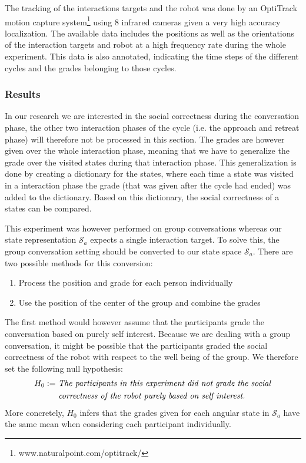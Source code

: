 \documentclass[a4paper,11pt]{report}
\begin{document}
The tracking of the interactions targets and the robot was done by an OptiTrack motion capture system\footnote{www.naturalpoint.com/optitrack/} using 8 infrared cameras given a very high accuracy localization. 
The available data includes the positions as well as the orientations of the interaction targets and robot at a high frequency rate during the whole experiment.
This data is also annotated, indicating the time steps of the different cycles and the grades belonging to those cycles. 

\subsubsection{Results}
\label{sec:group_result}

In our research we are interested in the social correctness during the conversation phase, the other two interaction phases of the cycle (i.e. the approach and retreat phase) will therefore not be processed in this section.
The grades are however given over the whole interaction phase, meaning that we have to generalize the grade over the visited states during that interaction phase.
This generalization is done by creating a dictionary for the states, where each time a state was visited in a interaction phase the grade (that was given after the cycle had ended) was added to the dictionary.
Based on this dictionary, the social correctness of a states can be compared.

This experiment was however performed on group conversations whereas our state representation $\mathcal{S}_a$ expects a single interaction target.
To solve this, the group conversation setting should be converted to our state space $\mathcal{S}_a$. There are two possible methods for this conversion:
\begin{enumerate}
\item Process the position and grade for each person individually
\item Use the position of the center of the group and combine the grades
\end{enumerate}

The first method would however assume that the participants grade the conversation based on purely self interest.
Because we are dealing with a group conversation, it might be possible that the participants graded the social correctness of the robot with respect to the well being of the group.
We therefore set the following null hypothesis:
\begin{align*}
 H_0 := & \text{ \textit{The participants in this experiment did not grade the social}}\\
        & \text{ \textit{correctness of the robot purely based on self interest.}}
\end{align*}
More concretely, $H_0$ infers that the grades given for each angular state in $\mathcal{S}_a$ have the same mean when considering each participant individually.
\end{document}
